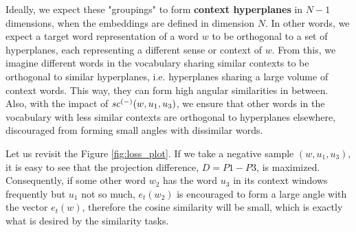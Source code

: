 Ideally, we expect these "groupings" to form \textbf{context hyperplanes} in $N-1$ dimensions, when the embeddings are defined in dimension $N$. In other words, we expect a target word representation of a word $w$ to be orthogonal to a set of hyperplanes, each representing a different sense or context of $w$. From this, we imagine different words in the vocabulary sharing similar contexts to be orthogonal to similar hyperplanes, i.e. hyperplanes sharing a large volume of context words. This way, they can form high angular similarities in between. Also, with the impact of $\mathit{sc}^{({-})}({w, u_1, u_3})$, we ensure that other words in the vocabulary with less similar contexts are orthogonal to hyperplanes elsewhere, discouraged from forming small angles with dissimilar words.

Let us revisit the Figure \ref{fig:loss_plot}. If we take a negative sample $(w, u_1, u_3)$, it is easy to see that the projection difference, $D = P1 - P3$, is maximized. Consequently, if some other word $w_2$ has the word $u_3$ in its context windows frequently but $u_1$ not so much, $e_t(w_2)$ is encouraged to form a large angle with the vector $e_t(w)$, therefore the cosine similarity will be small, which is exactly what is desired by the similarity tasks.

